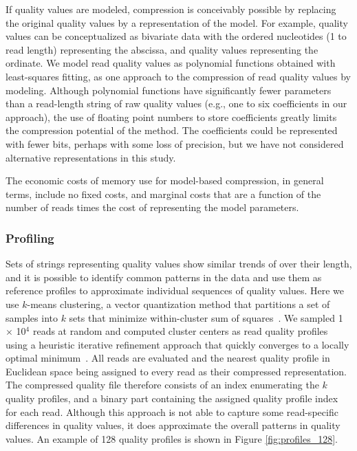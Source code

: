 \documentclass{bioinfo}
\begin{document}
\begin{methods}
If quality values are modeled, compression is conceivably possible by
replacing the original quality values by a representation of the
model. For example, quality values can be conceptualized as bivariate
data with the ordered nucleotides (1 to read length) representing the
abscissa, and quality values representing the ordinate. We model read
quality values as polynomial functions obtained with least-squares
fitting, as one approach to the compression of read quality values by
modeling. Although polynomial functions have significantly fewer
parameters than a read-length string of raw quality values (e.g., one
to six coefficients in our approach), the use of floating point
numbers to store coefficients greatly limits the compression potential
of the method. The coefficients could be represented with fewer bits,
perhaps with some loss of precision, but we have not considered
alternative representations in this study.

The economic costs of memory use for model-based compression, in
general terms, include no fixed costs, and marginal costs that are a
function of the number of reads times the cost of representing the
model parameters.

\subsubsection{Profiling}

Sets of strings representing quality values show similar trends of
over their length, and it is possible to identify common patterns in
the data and use them as reference profiles to approximate individual
sequences of quality values. Here we use $k$-means clustering, a
vector quantization method that partitions a set of samples into $k$
sets that minimize within-cluster sum of
squares~\citep{macqueen1967some}. We sampled 1 $\times$ 10$^{4}$ reads
at random and computed cluster centers as read quality profiles using
a heuristic iterative refinement approach that quickly converges to a
locally optimal minimum~\citep{hartigan1979algorithm}. All reads are
evaluated and the nearest quality profile in Euclidean space being
assigned to every read as their compressed representation.  The
compressed quality file therefore consists of an index enumerating the
$k$ quality profiles, and a binary part containing the assigned
quality profile index for each read.  Although this approach is not
able to capture some read-specific differences in quality values, it
does approximate the overall patterns in quality values. An example of
128 quality profiles is shown in Figure \ref{fig:profiles_128}.


\end{methods}
\end{document}
